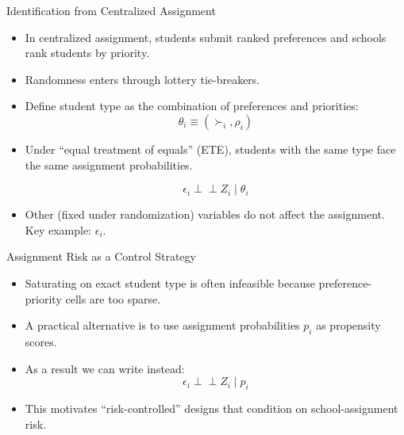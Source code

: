 \documentclass[notes,11pt, aspectratio=169]{beamer}
\let\oldparencite\parencite
\renewcommand{\parencite}[2][]{%
  \footnotesize {\tiny \oldparencite[#1]{#2}} \normalsize %
}
\begin{document}
\begin{frame}{Identification from Centralized Assignment}
\begin{itemize}
    \item In centralized assignment, students submit ranked preferences and schools rank students by priority.
    \item Randomness enters through lottery tie-breakers.
    \item Define student type as the combination of preferences and priorities:
    \[
    \theta_i \equiv (\succ_i, \rho_i)
    \]
    \item Under ``equal treatment of equals'' (ETE), students with the same type face the same assignment probabilities.  \parencite{abdulkadiroglu_research_2017}
      \[
    \epsilon_i \perp\!\!\!\perp Z_i \mid \theta_i
    \]
    \item Other (fixed under randomization) variables do not affect the assignment. Key example: $\epsilon_i$. 

\end{itemize}
\end{frame}

\begin{frame}{Assignment Risk as a Control Strategy}
\begin{itemize}
    \item Saturating on exact student type is often infeasible because preference-priority cells are too sparse.
    \item A practical alternative is to use assignment probabilities \(p_i\) as propensity scores. \parencite{abdulkadiroglu_research_2017,rosenbaum_central_1983} 

    \item As a result we can write instead: 
    \[
    \epsilon_i \perp\!\!\!\perp Z_i \mid p_i
    \]
    \item This motivates ``risk-controlled'' designs that condition on school-assignment risk.
\end{itemize}
\end{frame}
\end{document}

